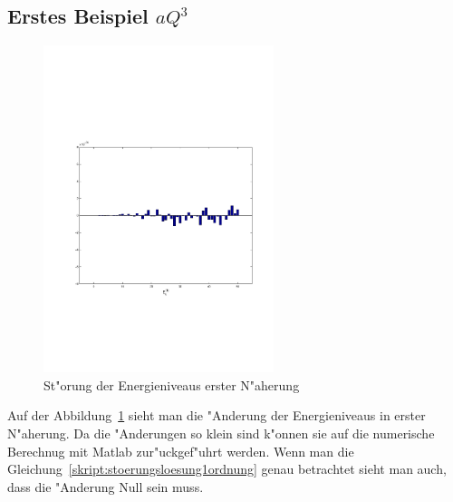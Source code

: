 \begin{refsection}
\subsection{Erstes Beispiel $aQ^3$}

\begin{figure}[h]	%
\centering
\includegraphics[width=0.6\textwidth]{anharmonisch/images/x3/EK1.pdf}
\caption{St"orung der Energieniveaus erster N"aherung
\label{skript:x3_EK1}}
\end{figure}

Auf der Abbildung~\ref{skript:x3_EK1} sieht man die "Anderung der Energieniveaus in erster N"aherung. Da die "Anderungen so klein sind k"onnen sie auf die numerische Berechnug mit Matlab zur"uckgef"uhrt werden. Wenn man die Gleichung~\ref{skript:stoerungsloesung1ordnung} genau betrachtet sieht man auch, dass die "Anderung Null sein muss.


\end{refsection}
